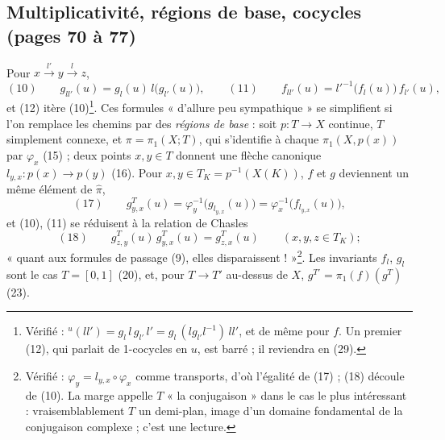 \documentclass[11pt,a4paper]{article}
\begin{document}
\subsection*{Multiplicativité, régions de base, cocycles (pages 70 à 77)}

Pour $x \xrightarrow{l'} y \xrightarrow{l} z$,
\[
(10)\qquad g_{ll'}(u) = g_l(u)\, l\bigl(g_{l'}(u)\bigr), \qquad
(11)\qquad f_{ll'}(u) = l'^{-1}\bigl(f_l(u)\bigr)\, f_{l'}(u) ,
\]
et (12) itère (10)\footnote{Vérifié : ${}^{u}(ll') = g_l\, l\, g_{l'}\, l' =
g_l\,(l g_{l'} l^{-1})\,ll'$, et de même pour $f$. Un premier (12), qui
parlait de 1-cocycles en $u$, est barré ; il reviendra en (29).}. Ces formules
« d'allure peu sympathique » se simplifient si l'on remplace les chemins par
des \emph{régions de base} : soit $p : T \to X$ continue, $T$ simplement
connexe, et $\pi = \pi_1(X; T)$, qui s'identifie à chaque $\pi_1(X, p(x))$ par
$\varphi_x$ (15) ; deux points $x, y \in T$ donnent une flèche canonique
$l_{y,x} : p(x) \to p(y)$ (16). Pour $x, y \in T_K = p^{-1}(X(K))$, $f$ et $g$
deviennent un même élément de $\widehat\pi$,
\[
(17)\qquad g^{T}_{y,x}(u) = \varphi_y^{-1}\bigl(g_{l_{y,x}}(u)\bigr) = \varphi_x^{-1}\bigl(f_{l_{y,x}}(u)\bigr),
\]
et (10), (11) se réduisent à la relation de Chasles
\[
(18)\qquad g^{T}_{z,y}(u)\, g^{T}_{y,x}(u) = g^{T}_{z,x}(u) \qquad (x, y, z \in T_K) ;
\]
« quant aux formules de passage (9), elles disparaissent ! »\footnote{Vérifié :
$\varphi_y = l_{y,x} \circ \varphi_x$ comme transports, d'où l'égalité de
(17) ; (18) découle de (10). La marge appelle $T$ « la conjugaison » dans le
cas le plus intéressant : vraisemblablement $T$ un demi-plan, image d'un
domaine fondamental de la conjugaison complexe ; c'est une lecture.}. Les
invariants $f_l$, $g_l$ sont le cas $T = [0, 1]$ (20), et, pour $T \to T'$ au-dessus
de $X$, $g^{T'} = \pi_1(f)(g^{T})$ (23).
\end{document}

